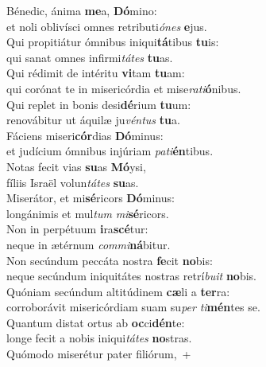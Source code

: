 \evenverse Bénedic, ánima \textbf{me}a, \textbf{Dó}mino:~\*\\
\evenverse et noli oblivísci omnes retributi\textit{ó}\textit{nes} \textbf{e}jus.\\
\oddverse Qui propitiátur ómnibus iniqui\textbf{tá}tibus \textbf{tu}is:~\*\\
\oddverse qui sanat omnes infirmi\textit{tá}\textit{tes} \textbf{tu}as.\\
\evenverse Qui rédimit de intéritu \textbf{vi}tam \textbf{tu}am:~\*\\
\evenverse qui corónat te in misericórdia et mise\textit{ra}\textit{ti}\textbf{ó}nibus.\\
\oddverse Qui replet in bonis desi\textbf{dé}rium \textbf{tu}um:~\*\\
\oddverse renovábitur ut áquilæ ju\textit{vén}\textit{tus} \textbf{tu}a.\\
\evenverse Fáciens miseri\textbf{cór}dias \textbf{Dó}minus:~\*\\
\evenverse et judícium ómnibus injúriam \textit{pa}\textit{ti}\textbf{én}tibus.\\
\oddverse Notas fecit vias \textbf{su}as \textbf{Mó}ysi,~\*\\
\oddverse fíliis Israël volun\textit{tá}\textit{tes} \textbf{su}as.\\
\evenverse Miserátor, et mi\textbf{sé}ricors \textbf{Dó}minus:~\*\\
\evenverse longánimis et mul\textit{tum} \textit{mi}\textbf{sé}ricors.\\
\oddverse Non in perpétuum \textbf{i}ra\textbf{scé}tur:~\*\\
\oddverse neque in ætérnum \textit{com}\textit{mi}\textbf{ná}bitur.\\
\evenverse Non secúndum peccáta nostra \textbf{fe}cit \textbf{no}bis:~\*\\
\evenverse neque secúndum iniquitátes nostras retrí\textit{bu}\textit{it} \textbf{no}bis.\\
\oddverse Quóniam secúndum altitúdinem \textbf{cæ}li a \textbf{ter}ra:~\*\\
\oddverse corroborávit misericórdiam suam su\textit{per} \textit{ti}\textbf{mén}tes se.\\
\evenverse Quantum distat ortus ab \textbf{oc}ci\textbf{dén}te:~\*\\
\evenverse longe fecit a nobis iniqui\textit{tá}\textit{tes} \textbf{no}stras.\\
\oddverse Quómodo miserétur pater filiórum,~+\\
